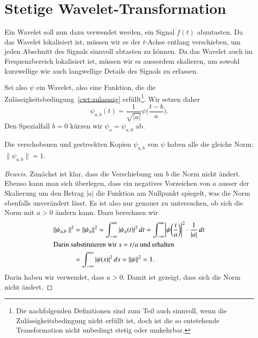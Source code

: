 %
%
%
\section{Stetige Wavelet-Transformation
\label{sextion:cwt}}
Ein Wavelet soll nun dazu verwendet werden, ein Signal $f(t)$
abzutasten.
Da das Wavelet lokalisiert ist, müssen wir es der $t$-Achse entlang
verschieben, um jeden Abschnitt des Signals sinnvoll abtasten zu
können.
Da das Wavelet auch im Frequenzbereich lokalisiert ist, müssen wir
es ausserdem skalieren, um sowohl kurzwellige wie auch langwellige
Details des Signals zu erfassen.

Sei also $\psi$ ein Wavelet, also eine Funktion, die die
Zulässigkeitsbedingung~\eqref{cwt:zulaessig} erfüllt\footnote{Die nachfolgenden
Definitionen sind zum Teil auch sinnvoll, wenn die Zulässigkeitsbedingung
nicht erfüllt ist, doch ist die so entstehende Transformation nicht unbedingt
stetig oder umkehrbar.}.
Wir setzen daher
\[
\psi_{a,b}(t) = \frac{1}{\sqrt{|a|}} \psi\biggl(\frac{t-b}a\biggr).
\]
Den Spezialfall $b=0$ kürzen wir $\psi_a = \psi_{a,0}$ ab.

\begin{lemma}
Die verschobenen und gestreckten Kopien $\psi_{a,b}$ von $\psi$ haben alle
die gleiche Norm: $\|\psi_{a,b}\|=1$.
\end{lemma}

\begin{proof}[Beweis]
Zunächst ist klar, dass die Verschiebung um $b$ die Norm nicht ändert.
Ebenso kann man sich überlegen, dass ein negatives Vorzeichen von $a$
ausser der Skalierung um den Betrag $|a|$ die Funktion am Nullpunkt spiegelt,
was die Norm ebenfalls unverändert lässt.
Es ist also nur genauer zu untersuchen, ob sich die Norm mit $a>0$ ändern
kann.
Dazu berechnen wir
\begin{align*}
\| \psi_{a,b} \|^2
&=
\| \psi_a \|^2
=
\int_{-\infty}^\infty |\psi_a(t)|^2 \, dt
=
\int_{-\infty}^\infty
\biggl|\psi\biggl(\frac{t}{a}\biggr)\biggr|^2\cdot \frac1{|a|}
\,dt
\\
\intertext{Darin substituieren wir $s=t/a$ und erhalten}
&=
\int_{-\infty}^\infty |\psi(s)|^2 \,ds
=
\|\psi\|^2=1.
\end{align*}
Darin haben wir verwendet, dass $a>0$.
Damit ist gezeigt, dass sich die Norm nicht ändert.
\end{proof}

